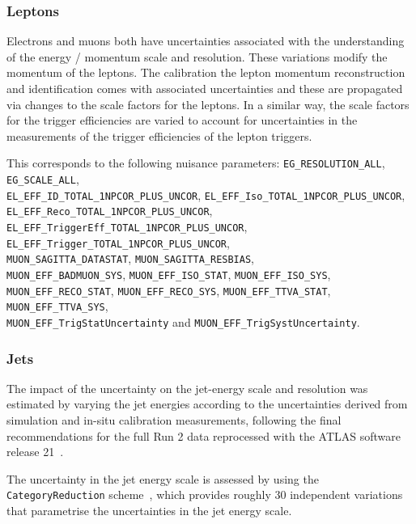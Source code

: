 \subsubsection{Leptons}

Electrons and muons both have uncertainties associated with the understanding
of the energy / momentum scale and resolution. These variations modify
the momentum of the leptons. The calibration the lepton momentum reconstruction
and identification comes with associated uncertainties and these are propagated
via changes to the scale factors for the leptons. In a similar way, the scale
factors for the trigger efficiencies are varied to account for uncertainties
in the measurements of the trigger efficiencies of the lepton triggers.

This corresponds to the following nuisance parameters:
\texttt{EG\_RESOLUTION\_ALL},
\texttt{EG\_SCALE\_ALL},\\
\texttt{EL\_EFF\_ID\_TOTAL\_1NPCOR\_PLUS\_UNCOR},
\texttt{EL\_EFF\_Iso\_TOTAL\_1NPCOR\_PLUS\_UNCOR},\\
\texttt{EL\_EFF\_Reco\_TOTAL\_1NPCOR\_PLUS\_UNCOR},
\texttt{EL\_EFF\_TriggerEff\_TOTAL\_1NPCOR\_PLUS\_UNCOR},\\
\texttt{EL\_EFF\_Trigger\_TOTAL\_1NPCOR\_PLUS\_UNCOR},\\
\texttt{MUON\_SAGITTA\_DATASTAT},
\texttt{MUON\_SAGITTA\_RESBIAS},\\
\texttt{MUON\_EFF\_BADMUON\_SYS},
\texttt{MUON\_EFF\_ISO\_STAT},
\texttt{MUON\_EFF\_ISO\_SYS},\\
\texttt{MUON\_EFF\_RECO\_STAT},
\texttt{MUON\_EFF\_RECO\_SYS},
\texttt{MUON\_EFF\_TTVA\_STAT},
\texttt{MUON\_EFF\_TTVA\_SYS},\\
\texttt{MUON\_EFF\_TrigStatUncertainty} and
\texttt{MUON\_EFF\_TrigSystUncertainty}.


\subsubsection{Jets}%
\label{sec:systematics:jets}
The impact of the uncertainty on the jet-energy scale and resolution was
estimated by varying the jet energies according to the uncertainties derived
from simulation and in-situ calibration measurements, following the final
recommendations for the full Run 2 data reprocessed with the ATLAS software
release 21~\cite{JETM-2018-05}.

The uncertainty in the jet energy scale is assessed by using the \texttt{CategoryReduction}
scheme~\cite{web:JetSystematics}, which provides roughly 30 independent variations that
parametrise the uncertainties in the jet energy scale.

